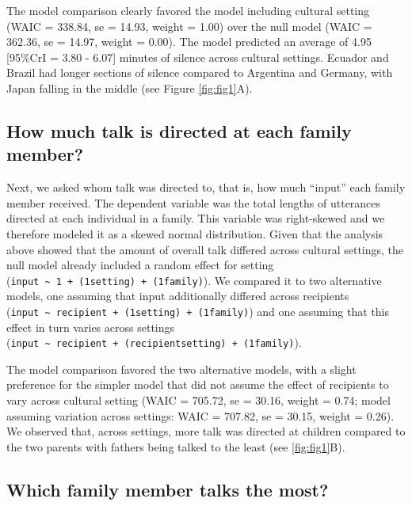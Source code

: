 \documentclass[
  man,floatsintext]{apa6}
\begin{document}
The model comparison clearly favored the model including cultural setting (WAIC = 338.84, se = 14.93, weight = 1.00) over the null model (WAIC = 362.36, se = 14.97, weight = 0.00). The model predicted an average of 4.95 {[}95\%CrI = 3.80 - 6.07{]} minutes of silence across cultural settings. Ecuador and Brazil had longer sections of silence compared to Argentina and Germany, with Japan falling in the middle (see Figure \ref{fig:fig1}A).

\hypertarget{how-much-talk-is-directed-at-each-family-member}{%
\subsection{How much talk is directed at each family member?}\label{how-much-talk-is-directed-at-each-family-member}}

Next, we asked whom talk was directed to, that is, how much ``input'' each family member received. The dependent variable was the total lengths of utterances directed at each individual in a family. This variable was right-skewed and we therefore modeled it as a skewed normal distribution. Given that the analysis above showed that the amount of overall talk differed across cultural settings, the null model already included a random effect for setting (\texttt{input\ \textasciitilde{}\ 1\ +\ (1\textbar{}setting)\ +\ (1\textbar{}family)}). We compared it to two alternative models, one assuming that input additionally differed across recipients (\texttt{input\ \textasciitilde{}\ recipient\ +\ (1\textbar{}setting)\ +\ (1\textbar{}family)}) and one assuming that this effect in turn varies across settings (\texttt{input\ \textasciitilde{}\ recipient\ +\ (recipient\textbar{}setting)\ +\ (1\textbar{}family)}).

The model comparison favored the two alternative models, with a slight preference for the simpler model that did not assume the effect of recipients to vary across cultural setting (WAIC = 705.72, se = 30.16, weight = 0.74; model assuming variation across settings: WAIC = 707.82, se = 30.15, weight = 0.26). We observed that, across settings, more talk was directed at children compared to the two parents with fathers being talked to the least (see \ref{fig:fig1}B).

\hypertarget{which-family-member-talks-the-most}{%
\subsection{Which family member talks the most?}\label{which-family-member-talks-the-most}}
\end{document}
